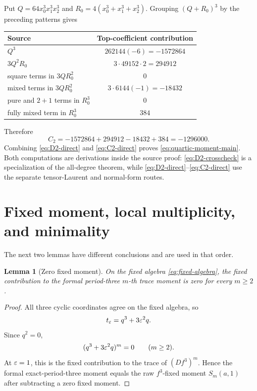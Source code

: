 \documentclass[11pt]{article}
\newtheorem{lemma}[theorem]{Lemma}
\theoremstyle{definition}
\theoremstyle{remark}
\begin{document}
Put \(Q=64x_0^3x_1^3x_2^3\) and
\(R_0=4(x_0^3+x_1^3+x_2^3)\).  Grouping
\((Q+R_0)^3\) by the preceding patterns gives
\begin{center}
\begin{tabular}{lc}
\toprule
Source & Top-coefficient contribution\\
\midrule
\(Q^3\) & \(262144(-6)=-1572864\)\\
\(3Q^2R_0\) & \(3\cdot49152\cdot2=294912\)\\
square terms in \(3QR_0^2\) & \(0\)\\
mixed terms in \(3QR_0^2\) & \(3\cdot6144(-1)=-18432\)\\
pure and \(2+1\) terms in \(R_0^3\) & \(0\)\\
fully mixed term in \(R_0^3\) & \(384\)\\
\bottomrule
\end{tabular}
\end{center}
Therefore
\begin{equation}
C_2=-1572864+294912-18432+384=-1296000.
\label{eq:C2-direct}
\end{equation}
Combining \eqref{eq:D2-direct} and \eqref{eq:C2-direct} proves
\eqref{eq:quartic-moment-main}.  Both computations are derivations inside
the source proof: \eqref{eq:D2-crosscheck} is a specialization of the
all-degree theorem, while \eqref{eq:D2-direct}--\eqref{eq:C2-direct} use the
separate tensor-Laurent and normal-form routes.

\section{Fixed moment, local multiplicity, and minimality}
\label{sec:minimality}

The next two lemmas have different conclusions and are used in that order.

\begin{lemma}[Zero fixed moment]
\label{lem:fixed-moment}
On the fixed algebra \eqref{eq:fixed-algebra}, the fixed contribution to the
formal period-three \(m\)-th trace moment is zero for every \(m\ge2\).
\end{lemma}

\begin{proof}
All three cyclic coordinates agree on the fixed algebra, so
\[
t_\varepsilon=q^3+3\varepsilon^2q.
\]
Since \(q^2=0\),
\[
(q^3+3\varepsilon^2q)^m=0
\qquad(m\ge2).
\]
At \(\varepsilon=1\), this is the fixed contribution to the trace of
\((Df^3)^m\).  Hence the formal exact-period-three moment equals the raw
\(f^3\)-fixed moment \(S_m(a,1)\) after subtracting a zero fixed moment.
\end{proof}
\end{document}
